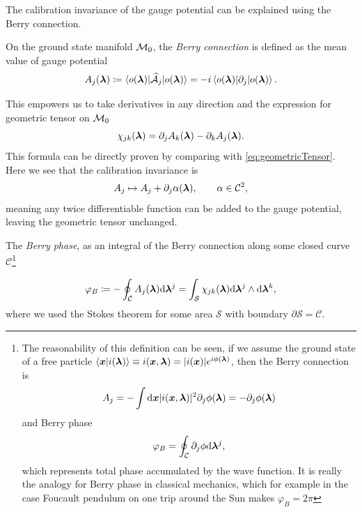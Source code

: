 The calibration invariance of the gauge potential can be explained using the Berry connection.
\begin{definition}    
    On the ground state manifold $\mathcal{M}_0$, the \emph{Berry connection} is defined as the mean value of gauge potential
    \begin{equation}
        A_j({\bm\lambda})\coloneqq \braket{o({\bm\lambda})|\mathcal{\widehat{A}}_j|o({\bm\lambda})}= -i \braket{o({\bm\lambda})|\partial_j|o({\bm\lambda})}.
        \label{eq:berryConnection}
    \end{equation}
\end{definition}
    

This empowers us to take derivatives in any direction and the expression for geometric tensor on $\mathcal{M}_0$
\begin{equation}
    \chi_{jk}({\bm\lambda}) = \partial_j A_k({\bm\lambda})-\partial_k A_j({\bm\lambda})
    \label{eq:geometricTensorRedef}.
\end{equation}
This formula can be directly proven by comparing with \ref{eq:geometricTensor}. Here we see that the calibration invariance is 
\begin{equation}
    A_j \mapsto A_j+\partial_j \alpha({\bm\lambda}),\qquad \alpha\in\mathcal C^2,
\end{equation}
meaning any twice differentiable function can be added to the gauge potential, leaving the geometric tensor unchanged.

\begin{definition}
    
    The \emph{Berry phase}, as an integral of the Berry connection along some closed curve $\mathcal{C}$\footnote{
        The reasonability of this definition can be seen, if we assume the ground state of a free particle
        $\braket{\bm{x}|i({\bm\lambda})}\equiv i(\bm{x},{\bm\lambda})= |i(\bm{x})|e^{i\phi({\bm\lambda})}$,
        then the Berry connection is
        \begin{equation}
            A_j=-\int \mathrm{d} \bm{x}|i(\bm{x},{\bm\lambda})|^2\partial_j \phi({\bm\lambda}) = -\partial_j \phi({\bm\lambda})
        \end{equation} 
        and Berry phase
        \begin{equation}
            \varphi_B=\oint_\mathcal{C} \partial_j \phi \mathrm{d} {\bm\lambda}^j,
        \end{equation}
        which represents total phase accumulated by the wave function. It is really the analogy for Berry phase in classical mechanics, which for example in the case Foucault pendulum on one trip around the Sun makes $\varphi_B=2\pi$
        }

    \begin{equation}
        \varphi_B\coloneqq-\oint_\mathcal{C} A_j({\bm\lambda})\mathrm{d} {\bm\lambda}^j=\int_\mathcal{S} \chi_{jk}({\bm\lambda})\mathrm{d} {\bm\lambda}^j \wedge \mathrm{d}{\bm\lambda}^k,
    \end{equation}
    where we used the Stokes theorem for some area $\mathcal{S}$ with boundary $\partial\mathcal{S}=\mathcal{C}$.    
    
\end{definition}

